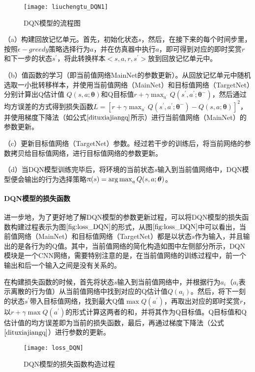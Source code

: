 \begin{figure}[htbp]
\centering
\texttt{[image: liuchengtu\_DQN1]}
\caption{DQN模型的流程图}
\label{fig:liuchengtu_DQN}
\end{figure}
 
（a）构建回放记忆单元。首先，初始化状态$s$，然后，在接下来的每个时间步里，按照$\epsilon-greedy$策略选择行为$a$，并在仿真器中执行$a$，即可得到对应的即时奖赏$r$和下一步的状态$s^{'}$，将此转换样本$<s, a, r, s^{'}>$放到回放记忆单元中。

（b）值函数的学习（即当前值网络MainNet的参数更新）。从回放记忆单元中随机选取一小批转移样本，并使用当前值网络（MainNet）和目标值网络（TargetNet）分别计算出Q估计值 $Q(s,a;\bm{\theta})$和Q目标值$r+\gamma \max_{a^{'}}Q(s^{'},a^{'};\bm{\theta}^{-})$，然后通过均方误差的方式得到损失函数$L=[r+\gamma \max_{a^{'}}Q(s^{'},a^{'};\bm{\theta}^{-})-Q(s,a;\bm{\theta})]^{2}$，并使用梯度下降法（如公式$\eqref{dituxiajiangq}$所示）进行当前值网络（MainNet）的参数更新。

（c）更新目标值网络（TargetNet）参数。经过若干步的训练后，将当前网络的参数拷贝给目标值网络，进行目标值网络的参数更新。 

（d）当DQN模型训练完毕后，将环境的当前状态$s$输入到当前值网络中，DQN模型便会输出的行为选择策略$\uppi(s)=\operatorname*{arg\,max}_{a}Q(s,a;\bm{\theta})$。

\paragraph{DQN模型的损失函数}
进一步地，为了更好地了解DQN模型的参数更新过程，可以将DQN模型的损失函数构建过程表示为图$\ref{fig:loss_DQN}$的形式，从图$\ref{fig:loss_DQN}$中可以看出，当前值网络（MainNet）和目标值网络（TargetNet）都是以状态$s$作为输入，并且输出的是各行为的Q值。其中，当前值网络的简化构造如图中左侧部分所示，DQN模块是一个CNN网络，需要特别注意的是，在当前值网络的训练过程中，前一个输出和后一个输入之间是没有关系的。

在构建损失函数的时候，首先将状态$s$输入到当前值网络中，并根据行为$a_{i}$（$a_{i}$表示离散的行为值）从当前值网络中找到对应的Q估计值$Q(a_{i})$。然后，将下一刻的状态$s^{'}$带入目标值网络，找到最大Q值$\max Q(a^{'})$，再取出对应的即时奖赏$r$，以$r+\gamma \max Q(a^{'})$的形式计算这两者的和，并将其作为Q目标值。Q目标值和Q估计值的均方误差即为当前的损失函数，最后，再通过梯度下降法（公式$\eqref{dituxiajiangq}$）进行参数的更新。

\begin{figure}[htbp]
\centering
\texttt{[image: loss\_DQN]}
\caption{DQN模型的损失函数构造过程}
\label{fig:loss_DQN}
\end{figure}

